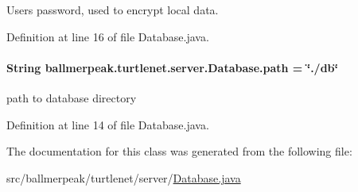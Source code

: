 Users password, used to encrypt local data. 



Definition at line 16 of file Database.\-java.

\hypertarget{classballmerpeak_1_1turtlenet_1_1server_1_1Database_a3933689115f43166439d740b2a254481}{
\paragraph[{path}]{\setlength{\rightskip}{0pt plus 5cm}String ballmerpeak.\-turtlenet.\-server.\-Database.\-path = \char`\"{}./db\char`\"{}\hspace{0.3cm}{\ttfamily [static]}}}\label{classballmerpeak_1_1turtlenet_1_1server_1_1Database_a3933689115f43166439d740b2a254481}


path to database directory 



Definition at line 14 of file Database.\-java.



The documentation for this class was generated from the following file\-:\begin{DoxyCompactItemize}
\item 
src/ballmerpeak/turtlenet/server/\hyperlink{Database_8java}{Database.\-java}\end{DoxyCompactItemize}
